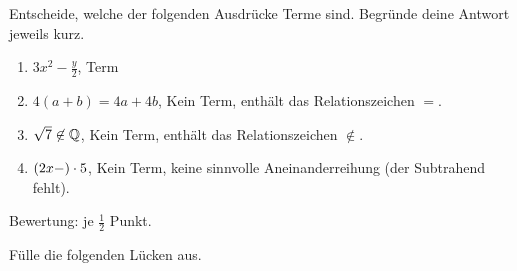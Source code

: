 \documentclass[11pt]{exam}
\begin{document}
\newpage
\begin{questions}
\question[2]
Entscheide, welche der folgenden Ausdrücke Terme sind. Begründe deine Antwort jeweils kurz.
{\begin{solution}
	\begin{enumerate}[label=(\alph*)]
		\item $3x^2-\frac{y}{2}$, Term
		\item $4(a+b)=4a+4b$, Kein Term, enthält das Relationszeichen $=$.
		\item $\sqrt{7}\not\in\mathbb{Q}$, Kein Term, enthält das Relationszeichen $\nin$.
		\item $(2x-)\cdot5$, Kein Term, keine sinnvolle Aneinanderreihung (der Subtrahend fehlt).
	\end{enumerate}
	Bewertung: je $\frac{1}{2}$ Punkt.
\end{solution}}
{
}


\noaddpoints
\question[\totalpoints] %
\addpoints
Fülle die folgenden Lücken aus.
{\begin{solution}
	\addpoints %
\end{solution}}
{\begin{parts}

\end{parts}}
\end{questions}
\end{document}
